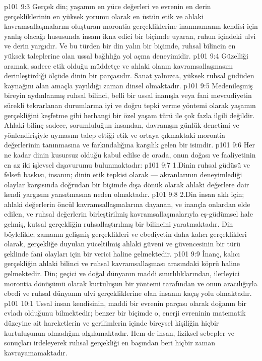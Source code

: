 \vs p101 9:3 Gerçek din; yaşamın en yüce değerleri ve evrenin en derin gerçekliklerinin en yüksek yorumu olarak en üstün etik ve ahlaki kavramsallaşmalarını oluşturan morontia gerçekliklerine inanmamanın kendisi için yanlış olacağı hususunda insanı ikna edici bir biçimde uyaran, ruhun içindeki ulvi ve derin yargıdır. Ve bu türden bir din yalın bir biçimde, ruhsal bilincin en yüksek taleplerine olan ussal bağlılığa yol açma deneyimidir.
\vs p101 9:4 Güzelliği aramak, sadece etik olduğu müddetçe ve ahlaki olanın kavramsallaşmasını derinleştirdiği ölçüde dinin bir parçasıdır. Sanat yalnızca, yüksek ruhsal güdüden kaynağını alan amaçla yayıldığı zaman dinsel olmaktadır.
\vs p101 9:5 Medenileşmiş bireyin aydınlanmış ruhsal bilinci, belli bir ussal inanışla veya fani mevcudiyetin sürekli tekrarlanan durumlarına iyi ve doğru tepki verme yöntemi olarak yaşamın gerçekliğini keşfetme gibi herhangi bir özel yaşam türü ile çok fazla ilgili değildir. Ahlaki bilinç sadece, sorumluluğun insandan, davranışın günlük denetimi ve yönlendirişiyle uymasını talep ettiği etik ve ortaya çıkmaktaki morontia değerlerinin tanınmasına ve farkındalığına karşılık gelen bir isimdir.
\vs p101 9:6 Her ne kadar dinin kusursuz olduğu kabul edilse de orada, onun doğası ve faaliyetinin en az iki işlevsel dışavurumu bulunmaktadır:
\vs p101 9:7 1.\bibnobreakspace Dinin ruhsal güdüsü ve felsefi baskısı, insanın; dinin etik tepkisi olarak --- akranlarının deneyimlediği olaylar karşısında doğrudan bir biçimde dışa dönük olarak ahlaki değerlere dair kendi yargısını yansıtmasına neden olmaktadır.
\vs p101 9:8 2.\bibnobreakspace Din insan aklı için; ahlaki değerlerin öncül kavramsallaşmalarına dayanan, ve inançla onlardan elde edilen, ve ruhsal değerlerin birleştirilmiş kavramsallaşmalarıyla eş\hyp{}güdümsel hale gelmiş, kutsal gerçekliğin ruhsallaştırılmış bir bilincini yaratmaktadır. Din böylelikle; zamanın gelişmiş gerçeklikleri ve ebediyetin daha kalıcı gerçeklikleri olarak, gerçekliğe duyulan yüceltilmiş ahlaki güveni ve güvencesinin bir türü şeklinde fani olayları için bir verici haline gelmektedir.
\vs p101 9:9 İnanç, kalıcı gerçekliğin ahlaki bilinci ve ruhsal kavramsallaşması arasındaki köprü haline gelmektedir. Din; geçici ve doğal dünyanın maddi sınırlılıklarından, ilerleyici morontia dönüşümü olarak kurtuluşun bir yöntemi tarafından ve onun aracılığıyla ebedi ve ruhsal dünyanın ulvi gerçekliklerine olan insanın kaçış yolu olmaktadır.
\vs p101 10:1 Ussal insan kendisinin, maddi bir evrenin parçası olarak doğanın bir evladı olduğunu bilmektedir; benzer bir biçimde o, enerji evreninin matematik düzeyine ait hareketlerin ve gerilimlerin içinde bireysel kişiliğin hiçbir kurtuluşunun olmadığını algılamaktadır. Hem de insan, fiziksel sebepler ve sonuçları irdeleyerek ruhsal gerçekliği en başından beri hiçbir zaman kavrayamamaktadır.
